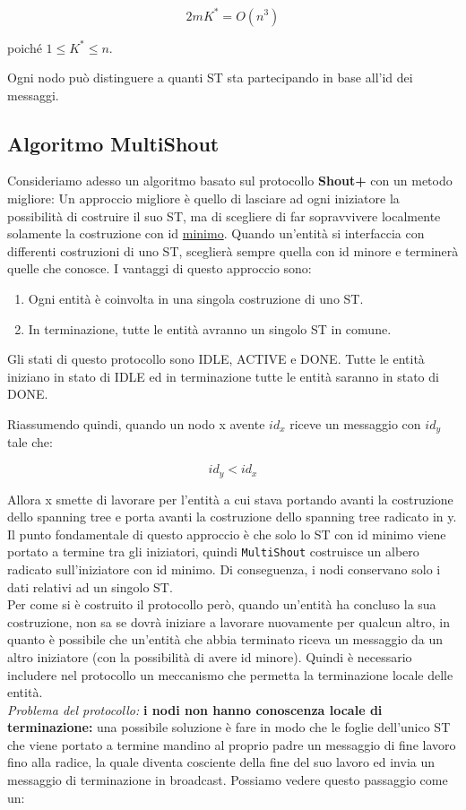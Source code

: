 $$2m K^* = O(n^3)$$

poiché $1 \leq K^* \leq n$. %

Ogni nodo può distinguere a quanti ST sta partecipando in base all'id dei
messaggi.

\subsection{Algoritmo MultiShout}
Consideriamo adesso un algoritmo basato sul protocollo \textbf{Shout+} con un
metodo migliore: Un approccio migliore è quello di lasciare ad ogni iniziatore
la possibilità di costruire il suo ST, ma di scegliere di far sopravvivere
localmente solamente la costruzione con id \underline{minimo}. Quando un'entità
si interfaccia con differenti costruzioni di uno ST, sceglierà sempre quella con
id minore e terminerà quelle che conosce. I vantaggi di questo approccio sono:

\begin{enumerate}
    \item Ogni entità è coinvolta in una singola costruzione di uno ST.
    \item In terminazione, tutte le entità avranno un singolo ST in comune.
\end{enumerate}

Gli stati di questo protocollo sono IDLE, ACTIVE e DONE. Tutte le entità
iniziano in stato di IDLE ed in terminazione tutte le entità saranno in stato di
DONE.

Riassumendo quindi, quando un nodo x avente $id_x$ riceve un messaggio con
$id_y$ tale che:

$$
    id_y < id_x
$$

Allora x smette di lavorare per l'entità a cui stava portando avanti la
costruzione dello spanning tree e porta avanti la costruzione dello spanning
tree radicato in y. Il punto fondamentale di questo approccio è che solo lo ST
con id minimo viene portato a termine tra gli iniziatori, quindi
\texttt{MultiShout} costruisce un albero radicato sull'iniziatore con id minimo.
Di conseguenza, i nodi conservano solo i dati relativi ad un singolo ST.\\
Per come si è costruito il protocollo però, quando un'entità ha concluso la sua
costruzione, non sa se dovrà iniziare a lavorare nuovamente per qualcun altro,
in quanto è possibile che un'entità che abbia terminato riceva un messaggio da
un altro iniziatore (con la possibilità di avere id minore). Quindi è necessario
includere nel protocollo un meccanismo che permetta la terminazione locale delle
entità. \\
\textit{Problema del protocollo:} \textbf{i nodi non hanno conoscenza locale di
    terminazione:} una possibile soluzione è fare in modo che le foglie dell'unico
ST che viene portato a termine mandino al proprio padre un messaggio di fine
lavoro fino alla radice, la quale diventa cosciente della fine del suo lavoro ed
invia un messaggio di terminazione in broadcast. Possiamo vedere questo
passaggio come un:

